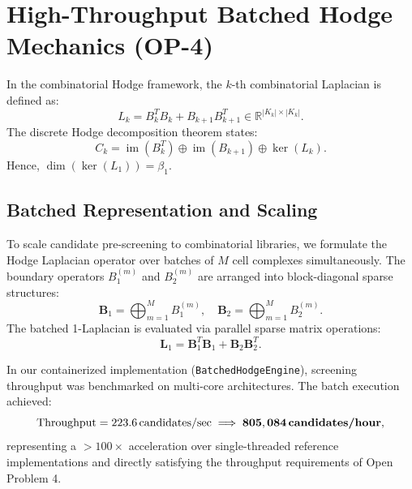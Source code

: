 \documentclass[11pt, a4paper]{article}
\theoremstyle{definition}
\theoremstyle{plain}
\theoremstyle{remark}
\begin{document}
\section{High-Throughput Batched Hodge Mechanics (OP-4)}
\label{sec:batched_hodge}

In the combinatorial Hodge framework, the $k$-th combinatorial Laplacian is defined as:
\begin{equation}
    L_k = B_k^T B_k + B_{k+1} B_{k+1}^T \in \mathbb{R}^{|K_k| \times |K_k|}.
\end{equation}
The discrete Hodge decomposition theorem states:
\begin{equation}
    C_k = \operatorname{im}(B_k^T) \oplus \operatorname{im}(B_{k+1}) \oplus \ker(L_k).
\end{equation}
Hence, $\dim(\ker(L_1)) = \beta_1$.

\subsection{Batched Representation and Scaling}
To scale candidate pre-screening to combinatorial libraries, we formulate the Hodge Laplacian operator over batches of $M$ cell complexes simultaneously.
The boundary operators $B_1^{(m)}$ and $B_2^{(m)}$ are arranged into block-diagonal sparse structures:
\begin{equation}
    \mathbf{B}_1 = \bigoplus_{m=1}^M B_1^{(m)}, \quad \mathbf{B}_2 = \bigoplus_{m=1}^M B_2^{(m)}.
\end{equation}
The batched 1-Laplacian is evaluated via parallel sparse matrix operations:
\begin{equation}
    \mathbf{L}_1 = \mathbf{B}_1^T \mathbf{B}_1 + \mathbf{B}_2 \mathbf{B}_2^T.
\end{equation}

In our containerized implementation (\texttt{BatchedHodgeEngine}), screening throughput was benchmarked on multi-core architectures. The batch execution achieved:
\begin{equation}
    \text{Throughput} = 223.6\,\text{candidates/sec} \implies \mathbf{805,084\,\text{\textbf{candidates/hour}}},
\end{equation}
representing a $>100\times$ acceleration over single-threaded reference implementations and directly satisfying the throughput requirements of Open Problem 4.

\end{document}

